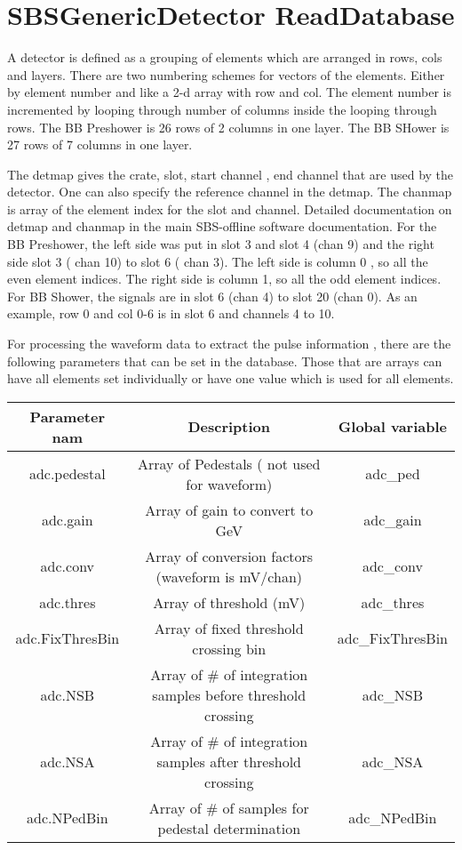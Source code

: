 \documentclass[11pt]{article}
\begin{document}
\section{SBSGenericDetector ReadDatabase}
A detector is defined as a grouping of elements which are arranged in rows, cols and layers.
There are two numbering schemes for vectors of the elements.
Either by element number and like a 2-d array with row and col. 
The element number is incremented
by looping through  number of columns inside the looping through rows.
The BB Preshower is 26 rows of 2 columns in one layer.  The BB SHower is 27 rows of 7 columns in one 
layer.

The detmap gives the crate, slot, start channel , end channel that are used by the detector.
One can also specify the reference channel in the detmap.
The chanmap is array of the element index for the slot and channel.
Detailed documentation on detmap and chanmap in the main SBS-offline software documentation.
For the BB Preshower, the left side was put in slot 3 and slot 4 (chan 9)  and the right side slot 3 ( chan 10)
to slot 6 ( chan 3). The left side is column 0 , so all the even element indices. The right side is 
column 1, so all the odd element indices. 
For BB Shower, the signals are in slot 6 (chan 4) to slot 20 (chan 0). As an example, row 0 and col 0-6
is in slot 6 and channels 4 to 10.

For processing the waveform data to extract the pulse information , there are the following parameters
that can be set in the database. Those that are arrays can have all elements set individually or have one value which is used for all elements.


\begin{center}
	\begin{tabular}{|c|c|c|}
		\hline 
		Parameter nam	& Description &  Global variable\\ 
		\hline 
		adc.pedestal	& Array of Pedestals ( not used for waveform) & adc\_ped \\ 
		\hline 
		adc.gain	& Array of gain to convert to GeV & adc\_gain\\ 
		\hline 
        adc.conv	& Array of conversion factors  (waveform is mV/chan) & adc\_conv\\ 
		\hline 
adc.thres	& Array of threshold  (mV) & adc\_thres\\ 
\hline 
adc.FixThresBin	& Array of fixed threshold crossing bin  & adc\_FixThresBin\\ 
\hline 
adc.NSB	& Array of \# of integration samples before threshold crossing  & adc\_NSB\\ 
\hline 
adc.NSA	& Array of \# of integration samples after threshold crossing  & adc\_NSA\\ 
\hline 
adc.NPedBin	& Array of \# of samples for pedestal determination  & adc\_NPedBin\\ 
\hline 
	\end{tabular} 
\end{center}
\end{document}
